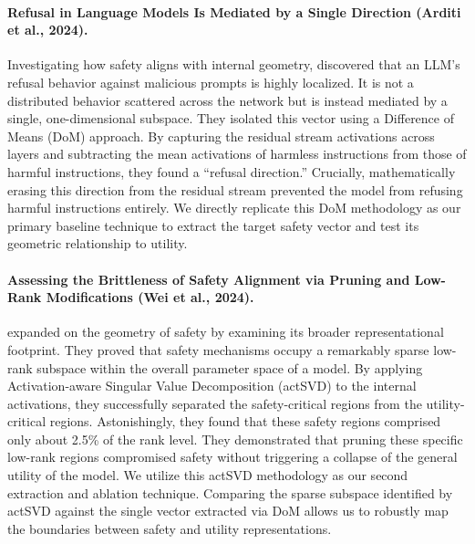 \paragraph{Refusal in Language Models Is Mediated by a Single Direction (Arditi et al., 2024).}
Investigating how safety aligns with internal geometry, \citet{arditi2024refusal} discovered that an LLM's refusal behavior against malicious prompts is highly localized. It is not a distributed behavior scattered across the network but is instead mediated by a single, one-dimensional subspace. They isolated this vector using a Difference of Means (DoM) approach. By capturing the residual stream activations across layers and subtracting the mean activations of harmless instructions from those of harmful instructions, they found a ``refusal direction.'' Crucially, mathematically erasing this direction from the residual stream prevented the model from refusing harmful instructions entirely. We directly replicate this DoM methodology as our primary baseline technique to extract the target safety vector and test its geometric relationship to utility.

\paragraph{Assessing the Brittleness of Safety Alignment via Pruning and Low-Rank Modifications (Wei et al., 2024).}
\citet{wei2024brittleness} expanded on the geometry of safety by examining its broader representational footprint. They proved that safety mechanisms occupy a remarkably sparse low-rank subspace within the overall parameter space of a model. By applying Activation-aware Singular Value Decomposition (actSVD) to the internal activations, they successfully separated the safety-critical regions from the utility-critical regions. Astonishingly, they found that these safety regions comprised only about 2.5\% of the rank level. They demonstrated that pruning these specific low-rank regions compromised safety without triggering a collapse of the general utility of the model. We utilize this actSVD methodology as our second extraction and ablation technique. Comparing the sparse subspace identified by actSVD against the single vector extracted via DoM allows us to robustly map the boundaries between safety and utility representations.
